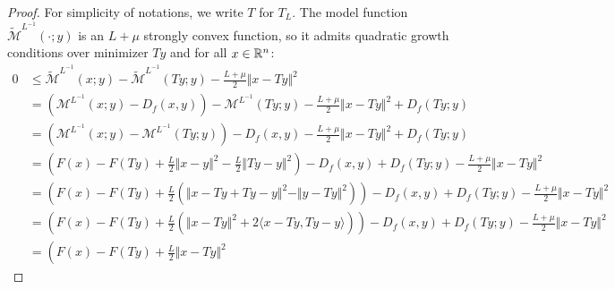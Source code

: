 \documentclass[12pt]{article}
\begin{document}
    \begin{proof}
        For simplicity of notations, we write $T$ for $T_L$. 
        The model function $\widetilde{\mathcal M}^{L^{-1}}(\cdot; y)$ is an $L + \mu$ strongly convex function, so it admits quadratic growth conditions over minimizer $Ty$ and for all $x \in \mathbb R^n$: 
        {\smaller
        \begin{align*}
            0 &\le 
            \widetilde{\mathcal M}^{L^{-1}}(x; y) - 
            \widetilde{\mathcal M}^{L^{-1}}(Ty; y)
            - 
            \frac{L + \mu}{2}\Vert x - Ty\Vert^2
            \\
            &= 
            \left(
                \mathcal M^{L^{-1}}(x; y) - D_f(x, y)
            \right) - 
            \mathcal M^{L^{-1}}(Ty; y) 
            - 
            \frac{L + \mu}{2}\Vert x - Ty\Vert^2
            + D_f(Ty; y)
            \\
            &=
            \left(
                \mathcal M^{L^{-1}}(x; y)
                - 
                \mathcal M^{L^{-1}}(Ty; y)
            \right)
            - 
            D_f(x, y) 
            - \frac{L + \mu}{2}\Vert x - Ty\Vert^2
            + D_f(Ty; y)
            \\
            &=
            \left(
                F(x) - F(Ty) 
                + 
                \frac{L}{2}\Vert x - y\Vert^2 - 
                \frac{L}{2}\Vert Ty - y\Vert^2
            \right)
            - D_f(x, y) 
            + D_f(Ty; y)
            - \frac{L + \mu}{2}\Vert x - Ty\Vert^2
            \\
            &=  
            \left(
                F(x) - F(Ty) 
                + 
                \frac{L}{2}
                \left(
                    \Vert x - Ty + Ty - y\Vert^2
                    - 
                    \Vert y - Ty\Vert^2
                \right)
            \right)
            - D_f(x, y) 
            + D_f(Ty; y)
            - \frac{L + \mu}{2}\Vert x - Ty\Vert^2
            \\
            &= 
            \left(
                F(x) - F(Ty) 
                + 
                \frac{L}{2}
                \left(
                    \Vert x - Ty\Vert^2 + 
                    2\langle x - Ty, Ty - y\rangle
                \right)
            \right)
            - D_f(x, y) 
            + D_f(Ty; y)
            - \frac{L + \mu}{2}\Vert x - Ty\Vert^2
            \\
            & = 
            \left(
                F(x) - F(Ty) + \frac{L}{2}\Vert x - Ty\Vert^2 

\end{align*}}
\end{proof}
\end{document}
